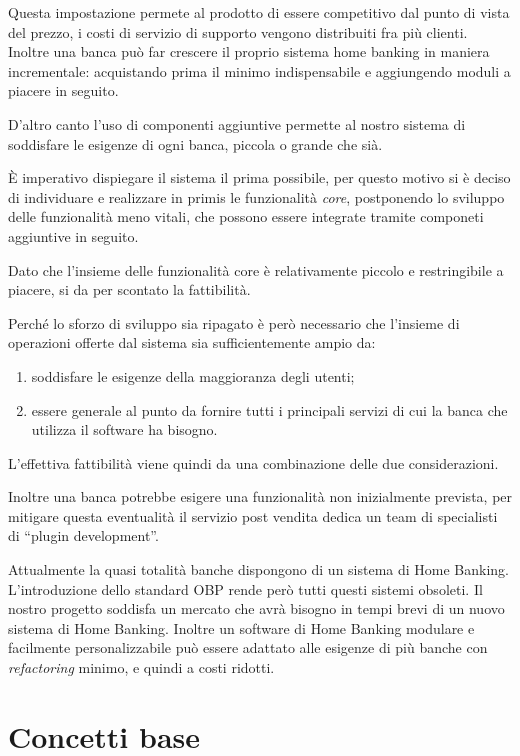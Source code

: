 \documentclass[10pt]{softeng} %
\begin{document}
Questa impostazione permete al prodotto di essere competitivo dal punto di vista del prezzo, i costi di servizio di supporto vengono distribuiti fra pi\`u clienti. Inoltre una banca pu\`o far crescere il proprio sistema home banking in maniera incrementale: acquistando prima il minimo indispensabile e aggiungendo moduli a piacere in seguito.

D'altro canto l'uso di componenti aggiuntive permette al nostro sistema di soddisfare le esigenze di ogni banca, piccola o grande che si\`a.

\`E imperativo dispiegare il sistema il prima possibile, per questo motivo si \`e deciso di individuare e realizzare in primis le funzionalit\`a \emph{core}, postponendo lo sviluppo delle funzionalit\`a meno vitali, che possono essere integrate tramite componeti aggiuntive in seguito.

Dato che l'insieme delle funzionalit\`a core \`e relativamente piccolo e restringibile a piacere, si da per scontato la fattibilit\`a.


Perch\'e lo sforzo di sviluppo sia ripagato \`e per\`o necessario che l'insieme di operazioni offerte dal sistema sia sufficientemente ampio da:
\begin{enumerate}
	\item soddisfare le esigenze della maggioranza degli utenti;
	\item essere generale al punto da fornire tutti i principali servizi di cui la banca che utilizza il software ha bisogno.
\end{enumerate}
L'effettiva fattibilit\`a viene quindi da una combinazione delle due considerazioni.


Inoltre una banca potrebbe esigere una funzionalit\`a non inizialmente prevista, per mitigare questa eventualit\`a il servizio post vendita dedica un team di specialisti di ``plugin development''.



Attualmente la quasi totalit\`a banche dispongono di un sistema di Home Banking.
L'introduzione dello standard OBP rende per\`o tutti questi sistemi obsoleti.
Il nostro progetto soddisfa un mercato che avr\`a bisogno in tempi brevi di un nuovo sistema di Home Banking.
Inoltre un software di Home Banking modulare e facilmente personalizzabile pu\`o essere adattato alle esigenze di pi\`u banche con \emph{refactoring} minimo, e quindi a costi ridotti.

\section{Concetti base}
\end{document}
